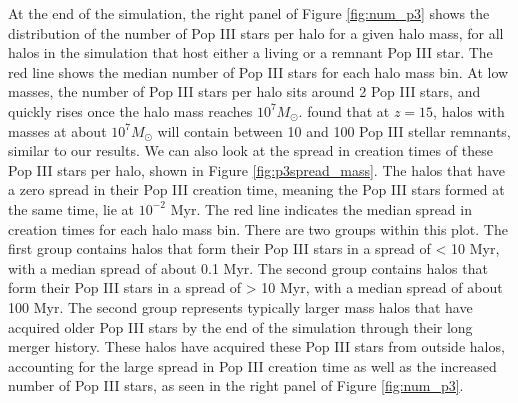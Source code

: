 \documentclass[fleqn,usenatbib]{mnras}
\begin{document}
At the end of the simulation, the right panel of Figure \ref{fig:num_p3} shows the distribution of the number of Pop III stars per halo for a given halo mass, for all halos in the simulation that host either a living or a remnant Pop III star. The red line shows the median number of Pop III stars for each halo mass bin. At low masses, the number of Pop III stars per halo sits around 2 Pop III stars, and quickly rises once the halo mass reaches $10^{7} M_{\odot}$. \citet{Xu13} found that at $z = 15$, halos with masses at about $10^{7} M_{\odot}$ will contain between 10 and 100 Pop III stellar remnants, similar to our results. We can also look at the spread in creation times of these Pop III stars per halo, shown in Figure \ref{fig:p3spread_mass}. The halos that have a zero spread in their Pop III creation time, meaning the Pop III stars formed at the same time, lie at $10^{-2}$ Myr. The red line indicates the median spread in creation times for each halo mass bin. There are two groups within this plot. The first group contains halos that form their Pop III stars in a spread of < 10 Myr, with a median spread of about 0.1 Myr. The second group contains halos that form their Pop III stars in a spread of > 10 Myr, with a median spread of about 100 Myr. The second group represents typically larger mass halos that have acquired older Pop III stars by the end of the simulation through their long merger history. These halos have acquired these Pop III stars from outside halos, accounting for the large spread in Pop III creation time as well as the increased number of Pop III stars, as seen in the right panel of Figure \ref{fig:num_p3}. 
\end{document}

